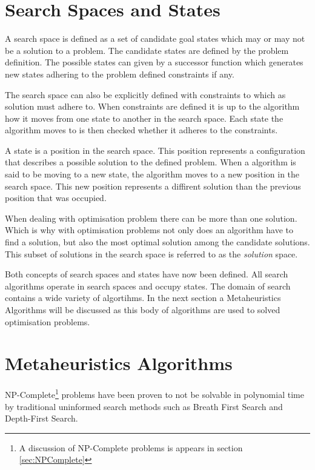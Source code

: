 \section{Search Spaces and States}
A search space is defined as a set of candidate goal states which may or may not be a solution to a problem\cite{AIModernApproach}. The candidate states are defined by the problem definition\cite{AIModernApproach}. The possible states can given by a successor function which generates new states adhering to the problem defined constraints if any\cite{AIModernApproach}. 

The search space can also be explicitly defined with constraints to which as solution must adhere to\cite{AIModernApproach}. When constraints are defined it is up to the algorithm how it moves from one state to another in the search space\cite{AIModernApproach}. Each state the algorithm moves to is then checked whether it adheres to the constraints\cite{AIModernApproach}.

A state is a position in the search space\cite{AIModernApproach}. This position represents a configuration that describes a possible solution to the defined problem\cite{AIModernApproach}. When a algorithm is said to be moving to a new state, the algorithm moves to a new position in the search space\cite{AIModernApproach}. This new position represents a diffirent solution than the previous position that was occupied\cite{AIModernApproach}.

When dealing with optimisation problem there can be more than one solution\cite{AIModernApproach}. Which is why with optimisation problems not only does an algorithm have to find a solution, but also the most optimal solution among the candidate solutions\cite{AIModernApproach}. This subset of solutions in the search space is referred to as the \emph{solution} space.

Both concepts of search spaces and states have now been defined. All search algorithms operate in search spaces and occupy states. The domain of search contains a wide variety of algortihms. In the next section a Metaheuristics Algorithms will be discussed as this body of algorithms are used to solved optimisation problems.

\section{Metaheuristics Algorithms}
NP-Complete\footnote{A discussion of NP-Complete problems is appears in section \ref{sec:NPComplete}} problems have been proven to not be solvable in polynomial time by traditional uninformed search methods such as Breath First Search and Depth-First Search\cite{AIModernApproach}. 

